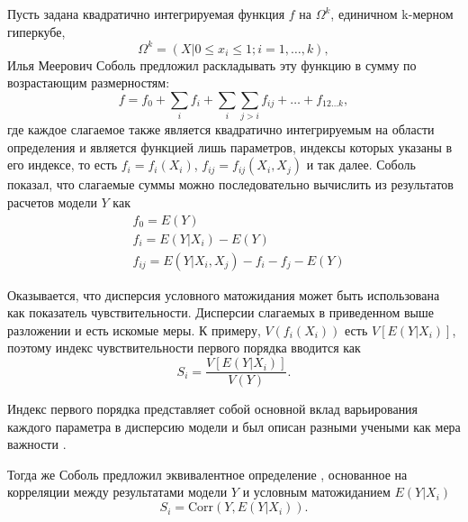 \documentclass[a4paper,12pt]{article} %
\begin{document}
Пусть задана квадратично интегрируемая функция $f$ на $\Omega^k$, единичном k-мерном гиперкубе,
\begin{displaymath}
\Omega^k=(X|0\leq x_i \leq 1;i=1,\ldots ,k),
\end{displaymath}
Илья Меерович Соболь предложил раскладывать эту функцию в сумму по возрастающим размерностям:
\begin{displaymath}
f=f_0+\sum\limits_i f_i + \sum\limits_i \sum\limits_{j>i} f_{ij}+\ldots+f_{12\ldots k},
\end{displaymath}
где каждое слагаемое также является квадратично интегрируемым на области определения и является функцией лишь параметров, индексы которых указаны в его индексе, то есть $f_i=f_i(X_i)$, $f_{ij}=f_{ij}(X_i,X_j)$ и так далее. Соболь показал, что слагаемые суммы можно последовательно вычислить из результатов расчетов модели $Y$ как
\begin{align*}
&f_0=E(Y) \\
&f_i=E(Y|X_i)-E(Y) \\
&f_{ij} = E(Y|X_i,X_j)-f_i-f_j-E(Y)
\end{align*}

Оказывается, что дисперсия условного матожидания может быть использована как показатель чувствительности. Дисперсии слагаемых в приведенном выше разложении и есть искомые меры. К примеру, $V(f_i(X_i))$ есть $V[E(Y|X_i)]$, поэтому индекс чувствительности первого порядка вводится как
\begin{displaymath}
S_i=\frac{V[E(Y|X_i)]}{V(Y)}.
\end{displaymath}

Индекс первого порядка представляет собой основной вклад варьирования каждого параметра в дисперсию модели и был описан разными учеными как мера важности \cite{hora1986comparison, ishigami1990importance, iman1990robust, saltelli1993sensitivity, homma1996importance}.

Тогда же Соболь предложил эквивалентное определение \cite{sobol1996freezing}, основанное на корреляции между результатами модели $Y$ и условным матожиданием $E(Y|X_i)$
\begin{displaymath}
S_i=\text{Corr}(Y,E(Y|X_i)).
\end{displaymath}
\end{document}
